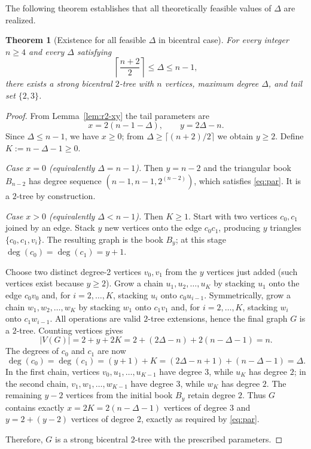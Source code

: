 \documentclass[12pt]{article}
\newtheorem{theorem}{Theorem}[section]
\numberwithin{equation}{section}
\begin{document}
The following theorem establishes that all theoretically feasible values of $\Delta$ are realized.

\begin{theorem}[Existence for all feasible $\Delta$ in bicentral case]
\label{thm:r2-existence}
For every integer $n\ge4$ and every $\Delta$ satisfying
\[
\left\lceil\frac{n+2}{2}\right\rceil\le\Delta\le n-1,
\]
there exists a strong bicentral $2$-tree with $n$ vertices, maximum degree $\Delta$, and tail set $\{2,3\}$.
\end{theorem}

\begin{proof}
From Lemma~\ref{lem:r2-xy} the tail parameters are
\begin{equation}\label{eq:par}
x=2(n-1-\Delta),\qquad y=2\Delta-n .
\end{equation}
Since $\Delta\le n-1$, we have $x\ge0$; from $\Delta\ge\lceil(n+2)/2\rceil$ 
we obtain $y\ge2$. Define $K:=n-\Delta-1\ge0$.

\noindent\emph{Case $x=0$ (equivalently $\Delta=n-1$).}
Then $y=n-2$ and the triangular book $B_{n-2}$ has degree sequence 
$(n-1,n-1,2^{(n-2)})$, which satisfies \eqref{eq:par}. It is a $2$-tree 
by construction.

\noindent\emph{Case $x>0$ (equivalently $\Delta<n-1$).}
Then $K\ge1$. Start with two vertices $c_0,c_1$ joined by an edge.
Stack $y$ new vertices onto the edge $c_0c_1$, producing $y$ triangles 
$\{c_0,c_1,v_i\}$. The resulting graph is the book $B_y$; at this stage
$\deg(c_0)=\deg(c_1)=y+1$.

Choose two distinct degree-2 vertices $v_0,v_1$ from the $y$ vertices 
just added (such vertices exist because $y\ge2$). Grow a chain 
$u_1,u_2,\dots,u_K$ by stacking $u_1$ onto the edge $c_0v_0$ and, for 
$i=2,\dots,K$, stacking $u_i$ onto $c_0u_{i-1}$. Symmetrically, grow 
a chain $w_1,w_2,\dots,w_K$ by stacking $w_1$ onto $c_1v_1$ and, for 
$i=2,\dots,K$, stacking $w_i$ onto $c_1w_{i-1}$. All operations are valid $2$-tree extensions, hence the final graph $G$ 
is a $2$-tree. Counting vertices gives
\[
|V(G)|=2+y+2K=2+(2\Delta-n)+2(n-\Delta-1)=n .
\]
The degrees of $c_0$ and $c_1$ are now
\[
\deg(c_0)=\deg(c_1)=(y+1)+K=(2\Delta-n+1)+(n-\Delta-1)=\Delta .
\]
In the first chain, vertices $v_0,u_1,\dots,u_{K-1}$ have degree $3$, 
while $u_K$ has degree $2$; in the second chain, $v_1,w_1,\dots,w_{K-1}$ 
have degree $3$, while $w_K$ has degree $2$. The remaining $y-2$ vertices 
from the initial book $B_y$ retain degree $2$. Thus $G$ contains exactly 
$x = 2K = 2(n-\Delta-1)$ vertices of degree $3$ and $y = 2+(y-2)$ vertices 
of degree $2$, exactly as required by \eqref{eq:par}.

Therefore, $G$ is a strong bicentral $2$-tree with the prescribed parameters.
\end{proof}
\end{document}
